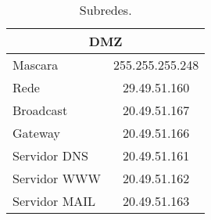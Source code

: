 \documentclass[a4paper,12pt]{article}
\begin{document}
\begin{table}[ht]
\begin{tabular}{ l | c }
						\multicolumn{2}{c}{DMZ} \\\hline 
						Mascara & 255.255.255.248 \\\hline
						Rede & 29.49.51.160 \\\hline 
						Broadcast & 20.49.51.167 \\\hline 
						Gateway & 20.49.51.166 \\\hline
						Servidor DNS & 20.49.51.161 \\\hline
						Servidor WWW & 20.49.51.162 \\\hline
						Servidor MAIL & 20.49.51.163 \\\hline
						\bottomrule
						\end{tabular}
						\caption{Subredes.}
						\label{tab:subredes}
						\end{table}

	
\end{document}
